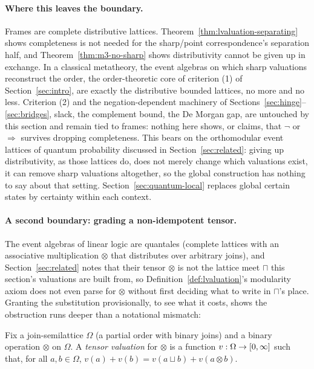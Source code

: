 \paragraph{Where this leaves the boundary.}
Frames are complete distributive lattices.
Theorem~\ref{thm:lvaluation-separating} shows completeness is not
needed for the sharp/point correspondence's separation half, and
Theorem~\ref{thm:m3-no-sharp} shows distributivity cannot be given
up in exchange. In a classical metatheory, the event algebras on which sharp valuations reconstruct the order,
the order-theoretic core of criterion (1) of
Section~\ref{sec:intro}, are exactly the distributive bounded
lattices, no more and no less. Criterion (2) and
the negation-dependent machinery of
Sections~\ref{sec:hinge}--\ref{sec:bridges}, slack, the complement
bound, the De Morgan gap, are untouched by this section and remain
tied to frames: nothing here shows, or claims, that $\neg$ or
$\Rightarrow$ survives dropping completeness. This bears on the
orthomodular event lattices of quantum probability discussed in
Section~\ref{sec:related}: giving up distributivity, as those
lattices do, does not merely change which valuations exist, it can
remove sharp valuations altogether, so the global construction has
nothing to say about that setting. Section~\ref{sec:quantum-local}
replaces global certain states by certainty within each context.

\paragraph{A second boundary: grading a non-idempotent tensor.}
The event algebras of linear logic are quantales (complete lattices
with an associative multiplication $\otimes$ that distributes over
arbitrary joins), and Section~\ref{sec:related} notes that their tensor
$\otimes$ is not the lattice meet $\sqcap$ this section's valuations
are built from, so Definition~\ref{def:lvaluation}'s modularity
axiom does not even parse for $\otimes$ without first deciding what
to write in $\sqcap$'s place. Granting the substitution
provisionally, to see what it costs, shows the obstruction runs
deeper than a notational mismatch:

\begin{definition}
\label{def:tensor-valuation}
Fix a join-semilattice $\Omega$ (a partial order with binary joins)
and a binary operation $\otimes$ on $\Omega$. A \emph{tensor valuation} for $\otimes$ is a function
$v : \Omega \to [0,\infty]$ such that, for all $a, b \in \Omega$,
$v(a) + v(b) = v(a \sqcup b) + v(a \otimes b)$.
\end{definition}

